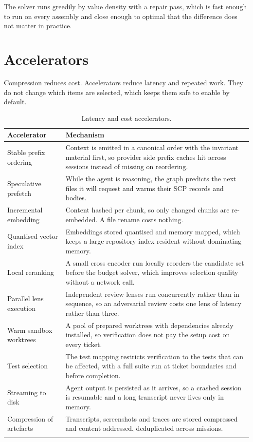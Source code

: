 The solver runs greedily by value density with a repair pass, which is fast enough to run on
every assembly and close enough to optimal that the difference does not matter in practice.

\section{Accelerators}

Compression reduces cost. Accelerators reduce latency and repeated work. They do not change
which items are selected, which keeps them safe to enable by default.

\begin{longtable}{@{}p{} p{}@{}}
\toprule
\textbf{Accelerator} & \textbf{Mechanism} \\
\midrule
\endhead
Stable prefix ordering & Context is emitted in a canonical order with the invariant material
first, so provider side prefix caches hit across sessions instead of missing on reordering. \\
Speculative prefetch & While the agent is reasoning, the graph predicts the next files it
will request and warms their SCP records and bodies. \\
Incremental embedding & Content hashed per chunk, so only changed chunks are re-embedded.
A file rename costs nothing. \\
Quantised vector index & Embeddings stored quantised and memory mapped, which keeps a large
repository index resident without dominating memory. \\
Local reranking & A small cross encoder run locally reorders the candidate set before the
budget solver, which improves selection quality without a network call. \\
Parallel lens execution & Independent review lenses run concurrently rather than in
sequence, so an adversarial review costs one lens of latency rather than three. \\
Warm sandbox worktrees & A pool of prepared worktrees with dependencies already installed,
so verification does not pay the setup cost on every ticket. \\
Test selection & The test mapping restricts verification to the tests that can be affected,
with a full suite run at ticket boundaries and before completion. \\
Streaming to disk & Agent output is persisted as it arrives, so a crashed session is
resumable and a long transcript never lives only in memory. \\
Compression of artefacts & Transcripts, screenshots and traces are stored compressed and
content addressed, deduplicated across missions. \\
\bottomrule
\caption{Latency and cost accelerators.}
\end{longtable}


